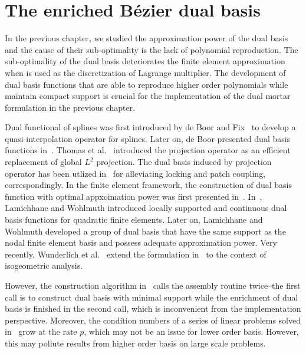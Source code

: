 \chapter{The enriched B\'ezier dual basis}
\label{chp:chapter4}
\graphicspath{{figures/}{figures/chapter4/}}



In the previous chapter, we studied the approximation power of the \Bezier dual basis and the cause of their sub-optimality is the lack of polynomial reproduction. The sub-optimality of the \Bezier dual basis deteriorates the finite element approximation when is used as the discretization of Lagrange multiplier. The development of dual basis functions that are able to reproduce higher order polynomials while maintain compact support is crucial for the implementation of the dual mortar formulation in the previous chapter.\par

Dual functional of splines was first introduced by de Boor and Fix~\cite{de1973spline} to develop a quasi-interpolation operator for splines. Later on, de Boor presented dual basis functions in~\cite{de1975local}. Thomas et al.~\cite{thomas2015bezier} introduced the \Bezier projection operator as an efficient replacement of global $L^2$ projection. The dual basis induced by \Bezier projection operator has been utlized in~\cite{MIAO2018273,zou2018isogeometric} for alleviating locking and patch coupling, correspondingly. In the finite element framework, the construction of dual basis function with optimal appxoimation power was first presented in~\cite{oswald2001polynomial}. In~\cite{lamichhane2002higher}, Lamichhane and Wohlmuth introduced locally supported and continuous dual basis functions for quadratic finite elements. Later on, Lamichhane and Wohlmuth developed a group of dual basis that have the same support as the nodal finite element basis and possess adequate approximation power. Very recently, Wunderlich et al.~\cite{wunderlich2019biorthogonal} extend the formulation in~\cite{oswald2001polynomial} to the context of isogeometric analysis.\par

However, the construction algorithm in~\cite{oswald2001polynomial} calls the assembly routine twice--the first call is to construct dual basis with minimal support while the enrichment of dual basis is finished in the second call, which is inconvenient from the implementation perspective. Moreover, the condition numbers of a series of linear problems solved in~\cite{oswald2001polynomial} grow at the rate $p$, which may not be an issue for lower order basis. However, this may pollute results from higher order basis on large scale problems. \par

